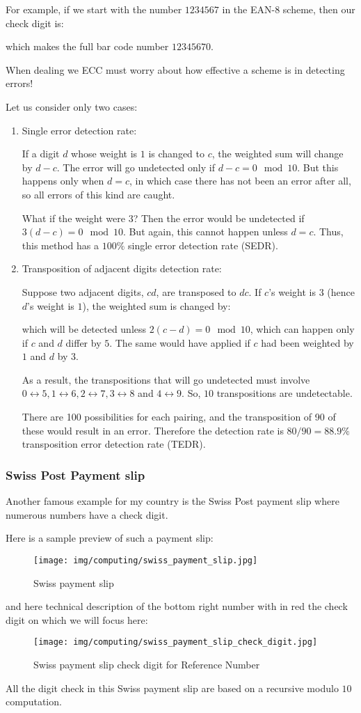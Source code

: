	For example, if we start with the number $1234567$ in the EAN-8 scheme, then our check digit is:
	
	which makes the full bar code number $12345670$.
	
	When dealing we ECC must worry about how effective a scheme is in detecting errors!
	
	Let us consider only two cases:
	\begin{enumerate}
		\item Single error detection rate:

		If a digit $d$ whose weight is $1$ is changed to $c$, the weighted sum will change by $d-c$. The error will go undetected only if $d-c=0 \mod 10$. But this happens only when $d=c$, in which case there has not been an error after all, so all errors of this kind are caught.

		What if the weight were $3$? Then the error would be undetected if $3(d-c)=0 \mod 10$. But again, this cannot happen unless $d=c$. Thus, this method has a $100\%$ single error detection rate (SEDR).

		\item Transposition of adjacent digits detection rate:

		Suppose two adjacent digits, $cd$, are transposed to $dc$. If $c$’s weight is $3$ (hence $d$’s weight is $1$), the weighted sum is changed by:
		
		which will be detected unless $2(c-d)=0 \mod 10$, which can happen only if $c$ and $d$ differ by $5$. The same would have applied if $c$ had been weighted by $1$ and $d$ by $3$.

		As a result, the transpositions that will go undetected must involve $0 \leftrightarrow 5, 1\leftrightarrow 6, 2 \leftrightarrow 7, 3 \leftrightarrow 8$ and $4 \leftrightarrow 9$. So, $10$ transpositions are undetectable.

		There are 100 possibilities for each pairing, and the transposition of 90 of these would result in an error. Therefore the detection rate is $ 80/90 = 88.9\% $ transposition error detection rate (TEDR).
	\end{enumerate}
	
	\subsubsection{Swiss Post Payment slip}
	Another famous example for my country is the Swiss Post payment slip where numerous numbers have a check digit.
	
	Here is a sample preview of such a payment slip:
	\begin{figure}[H]
		\centering
		\texttt{[image: img/computing/swiss\_payment\_slip.jpg]}
		\caption{Swiss payment slip}
	\end{figure}
	and here technical description of the bottom right number with in red the check digit on which we will focus here:
	\begin{figure}[H]
		\centering
		\texttt{[image: img/computing/swiss\_payment\_slip\_check\_digit.jpg]}
		\caption{Swiss payment slip check digit for Reference Number}
	\end{figure}
	All the digit check in this Swiss payment slip are based on a recursive modulo $10$ computation.
	
